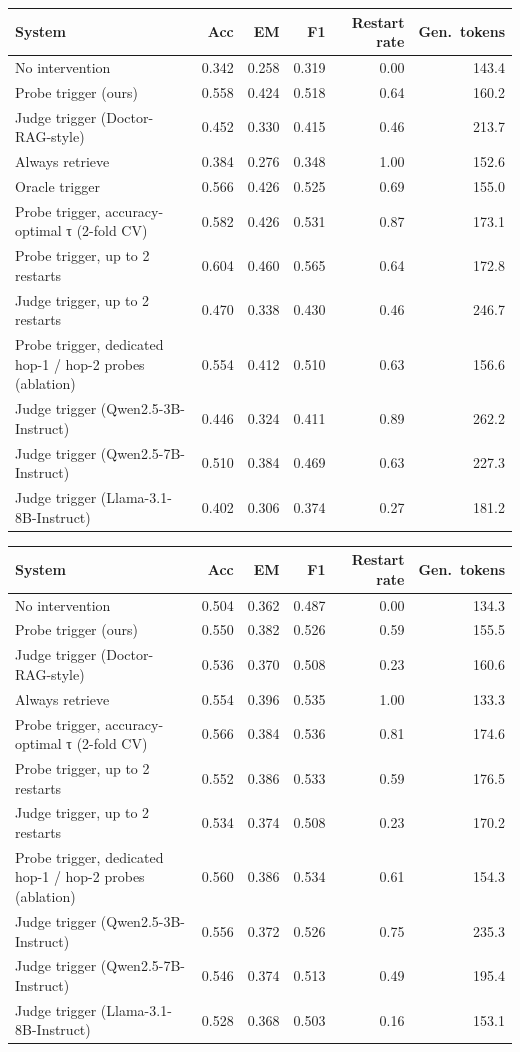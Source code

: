 \begin{tabular}{lrrrrr}
\toprule
System & Acc & EM & F1 & Restart rate & Gen.\ tokens \\
\midrule
No intervention & 0.342 & 0.258 & 0.319 & 0.00 & 143.4 \\
Probe trigger (ours) & 0.558 & 0.424 & 0.518 & 0.64 & 160.2 \\
Judge trigger (Doctor-RAG-style) & 0.452 & 0.330 & 0.415 & 0.46 & 213.7 \\
Always retrieve & 0.384 & 0.276 & 0.348 & 1.00 & 152.6 \\
Oracle trigger & 0.566 & 0.426 & 0.525 & 0.69 & 155.0 \\
Probe trigger, accuracy-optimal τ (2-fold CV) & 0.582 & 0.426 & 0.531 & 0.87 & 173.1 \\
Probe trigger, up to 2 restarts & 0.604 & 0.460 & 0.565 & 0.64 & 172.8 \\
Judge trigger, up to 2 restarts & 0.470 & 0.338 & 0.430 & 0.46 & 246.7 \\
Probe trigger, dedicated hop-1 / hop-2 probes (ablation) & 0.554 & 0.412 & 0.510 & 0.63 & 156.6 \\
Judge trigger (Qwen2.5-3B-Instruct) & 0.446 & 0.324 & 0.411 & 0.89 & 262.2 \\
Judge trigger (Qwen2.5-7B-Instruct) & 0.510 & 0.384 & 0.469 & 0.63 & 227.3 \\
Judge trigger (Llama-3.1-8B-Instruct) & 0.402 & 0.306 & 0.374 & 0.27 & 181.2 \\
\bottomrule
\end{tabular}

\begin{tabular}{lrrrrr}
\toprule
System & Acc & EM & F1 & Restart rate & Gen.\ tokens \\
\midrule
No intervention & 0.504 & 0.362 & 0.487 & 0.00 & 134.3 \\
Probe trigger (ours) & 0.550 & 0.382 & 0.526 & 0.59 & 155.5 \\
Judge trigger (Doctor-RAG-style) & 0.536 & 0.370 & 0.508 & 0.23 & 160.6 \\
Always retrieve & 0.554 & 0.396 & 0.535 & 1.00 & 133.3 \\
Probe trigger, accuracy-optimal τ (2-fold CV) & 0.566 & 0.384 & 0.536 & 0.81 & 174.6 \\
Probe trigger, up to 2 restarts & 0.552 & 0.386 & 0.533 & 0.59 & 176.5 \\
Judge trigger, up to 2 restarts & 0.534 & 0.374 & 0.508 & 0.23 & 170.2 \\
Probe trigger, dedicated hop-1 / hop-2 probes (ablation) & 0.560 & 0.386 & 0.534 & 0.61 & 154.3 \\
Judge trigger (Qwen2.5-3B-Instruct) & 0.556 & 0.372 & 0.526 & 0.75 & 235.3 \\
Judge trigger (Qwen2.5-7B-Instruct) & 0.546 & 0.374 & 0.513 & 0.49 & 195.4 \\
Judge trigger (Llama-3.1-8B-Instruct) & 0.528 & 0.368 & 0.503 & 0.16 & 153.1 \\
\bottomrule
\end{tabular}


